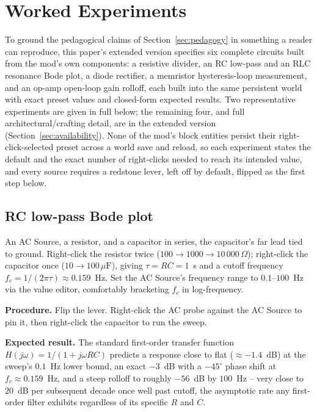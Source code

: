 \section{Worked Experiments}
\label{sec:experiments}

To ground the pedagogical claims of Section~\ref{sec:pedagogy} in something a reader can
reproduce, this paper's extended version specifies six complete circuits built from the
mod's own components: a resistive divider, an RC low-pass and an RLC resonance Bode plot, a
diode rectifier, a memristor hysteresis-loop measurement, and an op-amp open-loop gain
rolloff, each built into the same persistent world with exact preset values and closed-form
expected results. Two representative experiments are given in full below; the remaining four,
and full architectural/crafting detail, are in the extended version
(Section~\ref{sec:availability}). None of the mod's block entities persist their
right-click-selected preset across a world save and reload, so each experiment states the
default and the exact number of right-clicks needed to reach its intended value, and every
source requires a redstone lever, left off by default, flipped as the first step below.

\subsection{RC low-pass Bode plot}
\label{sec:exp-rc}

An AC Source, a resistor, and a capacitor in series, the capacitor's far lead tied to ground.
Right-click the resistor twice ($100\to1000\to10\,000\,\Omega$); right-click the capacitor
once ($10\to100\,\mu\text{F}$), giving $\tau=RC=1$~s and a cutoff frequency
$f_c=1/(2\pi\tau)\approx0.159$~Hz. Set the AC Source's frequency range to $0.1$--$100$~Hz via
the value editor, comfortably bracketing $f_c$ in log-frequency.

\textbf{Procedure.} Flip the lever. Right-click the AC probe against the AC Source to pin it,
then right-click the capacitor to run the sweep.

\textbf{Expected result.} The standard first-order transfer function
$H(j\omega)=1/(1+j\omega RC)$ predicts a response close to flat ($\approx-1.4$~dB) at the
sweep's $0.1$~Hz lower bound, an exact $-3$~dB with a $-45^\circ$ phase shift at
$f_c\approx0.159$~Hz, and a steep rolloff to roughly $-56$~dB by $100$~Hz -- very close to
$20$~dB per subsequent decade once well past cutoff, the asymptotic rate any first-order
filter exhibits regardless of its specific $R$ and $C$.

